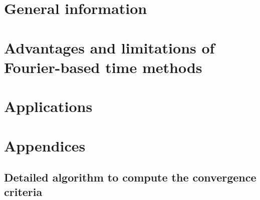 \documentclass[a4paper, twoside, 11pt, openright]{book}
\begin{document}
\frontmatter

 

\cleardoublepage


% 

\tableofcontents



% 



\mainmatter

\part{General information}
\label{part1}




\part{Advantages and limitations of Fourier-based time methods}
\label{part2}




\part{Applications}
\label{part3}







\appendix

\part*{Appendices}

\chapter{Detailed algorithm to compute the convergence criteria}

\end{document}
